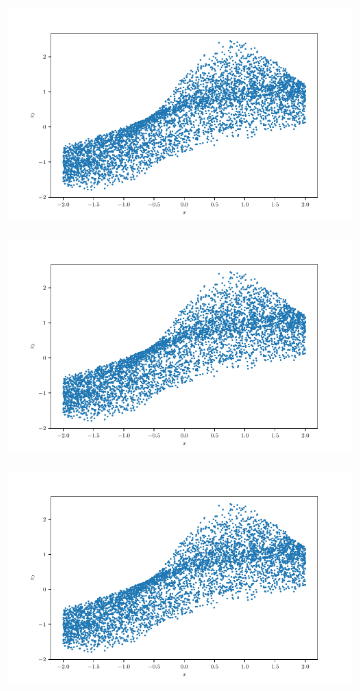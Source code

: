 \documentclass[10pt,a4paper]{article}
\begin{document}
\begin{figure}[!ht]
\centering
\begin{subfigure}{0.3\textwidth}
	\centering
	\includegraphics[width=\textwidth] {square_x_z0.pdf}
	\caption{}
	\label{fig_xzo}
\end{subfigure}
\begin{subfigure}{0.3\textwidth}
	\centering	
	\includegraphics[width=\textwidth]{square_x_z0.pdf}
	\caption{}
	\label{fig_xz1}
\end{subfigure}
\begin{subfigure}{0.3\textwidth}
	\centering
	\includegraphics[width=\textwidth] {square_x_z0.pdf}

\end{subfigure}
\end{figure}
\end{document}
